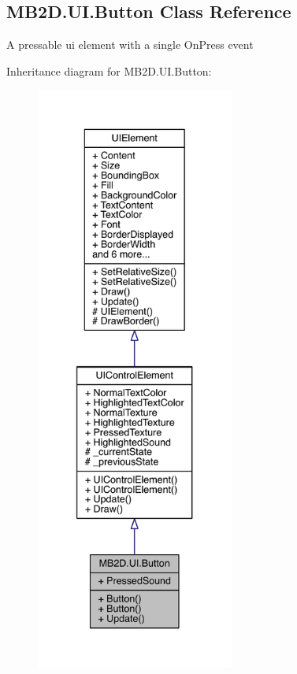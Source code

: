 \hypertarget{class_m_b2_d_1_1_u_i_1_1_button}{}\subsection{M\+B2\+D.\+U\+I.\+Button Class Reference}
\label{class_m_b2_d_1_1_u_i_1_1_button}


A pressable ui element with a single On\+Press event  




Inheritance diagram for M\+B2\+D.\+U\+I.\+Button\+:
\nopagebreak
\begin{figure}[H]
\begin{center}
\leavevmode
\includegraphics[height=550pt]{class_m_b2_d_1_1_u_i_1_1_button__inherit__graph}
\end{center}
\end{figure}


